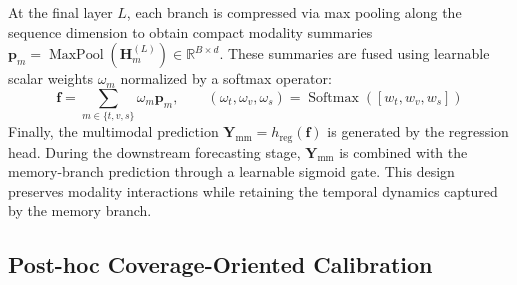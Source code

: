 \documentclass[journal]{IEEEtran}
\begin{document}
At the final layer $L$, each branch is compressed via max pooling along the sequence dimension to obtain compact modality summaries $\mathbf{p}_m = \operatorname{MaxPool}(\mathbf{H}_m^{(L)}) \in \mathbb{R}^{B \times d}$. These summaries are fused using learnable scalar weights $\omega_m$ normalized by a softmax operator:
\begin{equation}
\mathbf{f} = \sum_{m \in \{t,v,s\}} \omega_m \mathbf{p}_m, \qquad (\omega_t,\omega_v,\omega_s) = \operatorname{Softmax}([w_t, w_v, w_s])
\end{equation}
Finally, the multimodal prediction $\mathbf{Y}_{\mathrm{mm}} = h_{\mathrm{reg}}(\mathbf{f})$ is generated by the regression head. During the downstream forecasting stage, $\mathbf{Y}_{\mathrm{mm}}$ is combined with the memory-branch prediction through a learnable sigmoid gate. This design preserves modality interactions while retaining the temporal dynamics captured by the memory branch.

\subsection{Post-hoc Coverage-Oriented Calibration}
\end{document}
